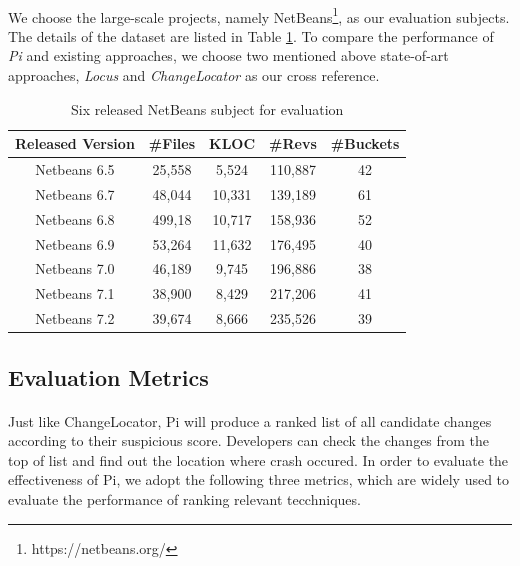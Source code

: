 \documentclass[a4paper]{article}
\begin{document}
\paragraph{}
We choose the large-scale projects, namely NetBeans\footnote{https://netbeans.org/}​, as our evaluation subjects. The details of the dataset are listed in Table \ref{NetBeansProject}.
To compare the performance of \emph{Pi} and existing approaches, we choose two mentioned above state-of-art approaches, \emph{Locus} and \emph{ChangeLocator} as our cross reference.
\vspace{-1em}

\begin{table}[!htbp]
\centering
\caption{Six released NetBeans subject for evaluation }\label{NetBeansProject}
\begin{tabular}{ccccc}
\toprule
Released Version & \#Files & KLOC & \#Revs & \#Buckets \\
\midrule
Netbeans 6.5 & 25,558 & 5,524 & 110,887 &  42 \\
Netbeans 6.7 & 48,044 & 10,331 & 139,189 & 61 \\
Netbeans 6.8 & 499,18 & 10,717 & 158,936 & 52 \\
Netbeans 6.9 & 53,264 & 11,632 & 176,495 & 40 \\
Netbeans 7.0 & 46,189 & 9,745 & 196,886 & 38 \\
Netbeans 7.1 & 38,900 & 8,429 & 217,206 & 41 \\
Netbeans 7.2 & 39,674 & 8,666 & 235,526 & 39 \\
\bottomrule
\end{tabular}
\end{table}


\subsection{Evaluation Metrics}
\paragraph{}
Just like ChangeLocator, Pi will produce a ranked list of all candidate changes according to their suspicious score. Developers can check the changes from the top of list and find out the location where crash occured. In order to evaluate the effectiveness of Pi, we adopt the following three metrics, which are widely used to evaluate the performance of ranking relevant tecchniques.\\
\vspace{-1em}
\end{document}
